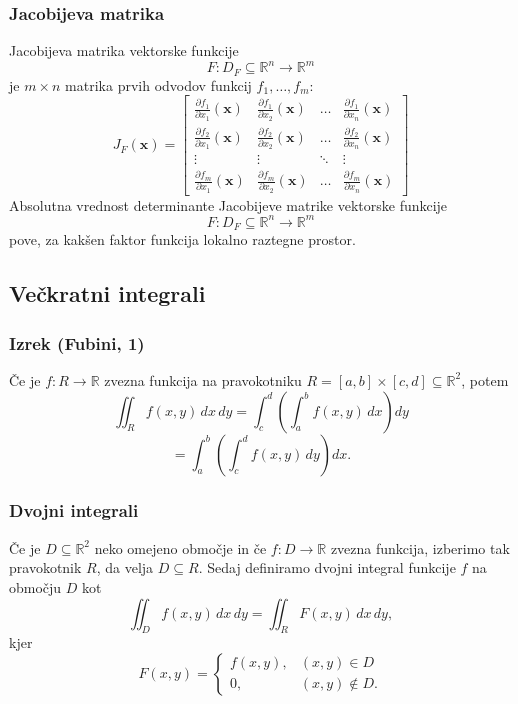 \documentclass{article}
\begin{document}
\begin{multicols}{2}
	\subsubsection{Jacobijeva matrika}
	Jacobijeva matrika vektorske funkcije
	\[ F: D_F \subseteq \mathbb{R}^n \rightarrow \mathbb{R}^m \]
	je \( m \times n \) matrika prvih odvodov funkcij \( f_1, \ldots, f_m \):
	\[
		J_F(\mathbf{x}) = \begin{bmatrix}
			\frac{\partial f_1}{\partial x_1}(\mathbf{x}) & \frac{\partial f_1}{\partial x_2}(\mathbf{x}) & \ldots & \frac{\partial f_1}{\partial x_n}(\mathbf{x}) \\
			\frac{\partial f_2}{\partial x_1}(\mathbf{x}) & \frac{\partial f_2}{\partial x_2}(\mathbf{x}) & \ldots & \frac{\partial f_2}{\partial x_n}(\mathbf{x}) \\
			\vdots                                        & \vdots                                        & \ddots & \vdots                                        \\
			\frac{\partial f_m}{\partial x_1}(\mathbf{x}) & \frac{\partial f_m}{\partial x_2}(\mathbf{x}) & \ldots & \frac{\partial f_m}{\partial x_n}(\mathbf{x})
		\end{bmatrix}
	\]
	Absolutna vrednost determinante Jacobijeve matrike vektorske funkcije
	\[ F: D_F \subseteq \mathbb{R}^n \rightarrow \mathbb{R}^m \]
	pove, za kakšen faktor funkcija lokalno raztegne prostor.

	\subsection{Večkratni integrali}

	\subsubsection{Izrek (Fubini, 1)}
	Če je \( f: R \rightarrow \mathbb{R} \) zvezna funkcija na pravokotniku \( R = [a, b] \times [c, d] \subseteq \mathbb{R}^2 \), potem
	\[
		\iint_R f(x,y) \,dx\,dy = \int_c^d \left( \int_a^b f(x,y) \,dx \right) dy
	\]
	\[
		= \int_a^b \left( \int_c^d f(x,y) \,dy \right) dx.
	\]


	\subsubsection{Dvojni integrali}

	Če je \( D \subseteq \mathbb{R}^2 \) neko omejeno območje in če \( f: D \rightarrow \mathbb{R} \) zvezna funkcija, izberimo tak pravokotnik \( R \), da velja \( D \subseteq R \). Sedaj definiramo dvojni integral funkcije \( f \) na območju \( D \) kot
	\[
		\iint_D f(x,y) \,dx\,dy = \iint_R F(x,y) \,dx\,dy,
	\]
	kjer
	\[
		F(x,y) = \begin{cases}
			f(x,y), & (x,y) \in D      \\
			0,      & (x,y) \not\in D.
		\end{cases}
	\]


\end{multicols}
\end{document}
